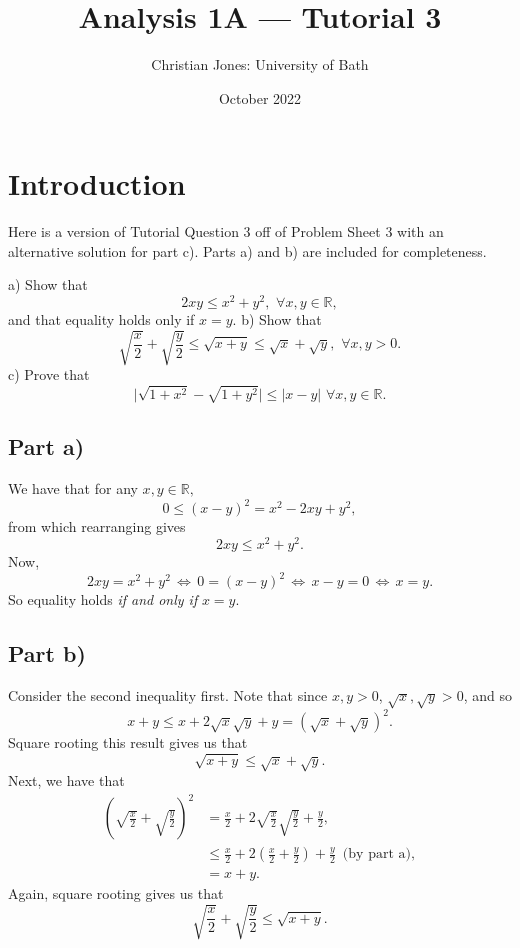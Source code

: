 \documentclass[
  17pt,
  a4paper]{extarticle}
\title{Analysis 1A --- Tutorial 3}
\author{Christian Jones: University of Bath}
\date{October 2022}
\theoremstyle{plain}
\theoremstyle{definition}
\theoremstyle{plain}
\theoremstyle{plain}
\theoremstyle{plain}
\theoremstyle{plain}
\theoremstyle{definition}
\theoremstyle{definition}
\theoremstyle{remark}
\theoremstyle{remark}
\let\BeginKnitrBlock\begin \let\EndKnitrBlock\end
\renewcommand{\;}{\,}
\begin{document}
\maketitle

{
\setcounter{tocdepth}{2}
\tableofcontents
}
\newpage
{}

\hypertarget{introduction}{%
\section*{Introduction}\label{introduction}}

Here is a version of Tutorial Question 3 off of Problem Sheet 3 with an alternative solution for part c). Parts a) and b) are included for completeness.

\BeginKnitrBlock{example}[PS3 Question 3]
{\label{exm:ex1} }a) Show that \[ 2xy \leq x^2 + y^2, \;\; \forall x,y \in \mathbb{R},\] and that equality holds only if \(x = y\).
b) Show that \[\sqrt{\frac{x}{2}} + \sqrt{\frac{y}{2}} \leq \sqrt{x + y} \leq \sqrt{x} + \sqrt{y}, \;\; \forall x,y > 0.\]
c) Prove that \[\lvert \sqrt{1 + x^2} - \sqrt{1 + y^2} \rvert \leq \lvert x - y \rvert \;\; \forall x,y \in \mathbb{R}.\]
\EndKnitrBlock{example}

\hypertarget{part-a}{%
\subsection*{Part a)}\label{part-a}}

\BeginKnitrBlock{solution*}
We have that for any \(x,y\in\mathbb{R},\) \[ 0 \leq (x-y)^2 = x^2 - 2xy + y^2,\] from which rearranging gives \[2xy \leq x^2 + y^2.\] Now, \[2xy = x^2 + y^2\; \Leftrightarrow\; 0 = (x-y)^2 \;\Leftrightarrow \;x-y = 0 \;\Leftrightarrow\; x=y.\] So equality holds \emph{if and only if} \(x = y.\)
\EndKnitrBlock{solution*}

\hypertarget{part-b}{%
\subsection*{Part b)}\label{part-b}}

\BeginKnitrBlock{solution*}
Consider the second inequality first. Note that since \(x,y > 0\), \(\sqrt{x}, \sqrt{y} > 0\), and so \[x + y \leq x + 2\sqrt{x}\sqrt{y} + y = (\sqrt{x} + \sqrt{y})^2.\] Square rooting this result gives us that \[\sqrt{x + y} \leq \sqrt{x} + \sqrt{y}.\] Next, we have that
\begin{align*}
\left(\sqrt{\frac{x}{2}} + \sqrt{\frac{y}{2}}\right)^2 &= \frac{x}{2} + 2\sqrt{\frac{x}{2}}\sqrt{\frac{y}{2}} + \frac{y}{2},\\
&\leq \frac{x}{2} + 2\left(\frac{x}{2} + \frac{y}{2}\right) + \frac{y}{2} \;\;\; \text{(by part a)},\\
&= x + y.
\end{align*}
Again, square rooting gives us that \[\sqrt{\frac{x}{2}} + \sqrt{\frac{y}{2}} \leq \sqrt{x + y}.\]
\EndKnitrBlock{solution*}
\end{document}
